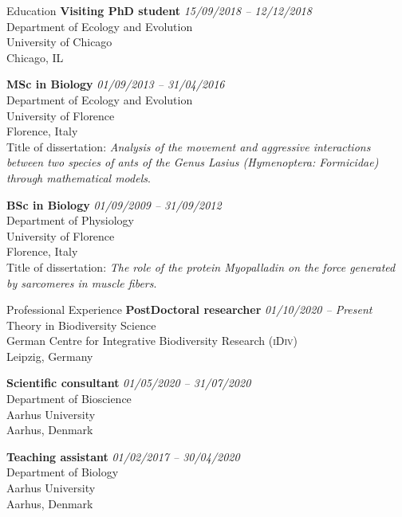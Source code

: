 \documentclass{resume} %
\begin{document}
\begin{rSection}{Education}
{\bf Visiting PhD student} \hfill {\em 15/09/2018 -- 12/12/2018}
\\ Department of Ecology and Evolution
\\ University of Chicago
\\ Chicago, IL

{\bf MSc in Biology} \hfill {\em 01/09/2013 -- 31/04/2016}
\\ Department of Ecology and Evolution
\\ University of Florence
\\ Florence, Italy
\\ Title of dissertation: \textit{Analysis of the movement and aggressive interactions between two species of ants of the Genus Lasius (Hymenoptera: Formicidae) through mathematical models}.

\clearpage

{\bf BSc in Biology} \hfill {\em 01/09/2009 -- 31/09/2012}
\\ Department of Physiology
\\ University of Florence
\\ Florence, Italy
\\ Title of dissertation: \textit{The role of the protein Myopalladin on the force generated by sarcomeres in muscle fibers}.
\end{rSection}

\begin{rSection}{Professional Experience}
{\bf PostDoctoral researcher} \hfill {\em 01/10/2020 -- Present}\\
Theory in Biodiversity Science\\
German Centre for Integrative Biodiversity Research (\textsc{iDiv})\\
Leipzig, Germany

{\bf Scientific consultant} \hfill {\em 01/05/2020 -- 31/07/2020}\\
Department of Bioscience\\
Aarhus University\\
Aarhus, Denmark

{\bf Teaching assistant} \hfill {\em 01/02/2017 -- 30/04/2020}
\\Department of Biology\\
Aarhus University\\
Aarhus, Denmark
\end{rSection}
\end{document}
